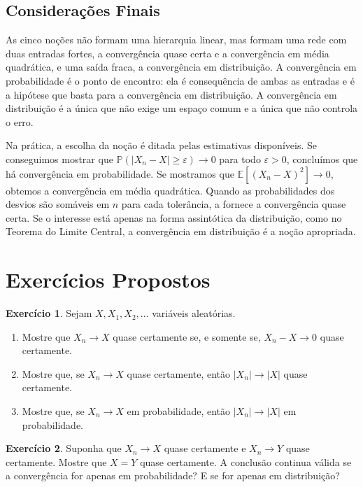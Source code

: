 \documentclass[12pt,portuguese]{article}
\theoremstyle{definition}
\theoremstyle{plainexercise}
\newtheorem{exercise}{Exercício}
\theoremstyle{starredexercise}
\theoremstyle{definition}
\begin{document}
\subsection{Considerações Finais}\label{subsec:leitura-final}

As cinco noções não formam uma hierarquia linear, mas formam uma rede com duas
entradas fortes, a convergência quase certa e a convergência em média
quadrática, e uma saída fraca, a convergência em distribuição. A convergência em
probabilidade é o ponto de encontro: ela é consequência de ambas as entradas e
é a hipótese que basta para a convergência em distribuição. A convergência em
distribuição é a única que não exige um espaço comum e a única que não controla
o erro.

Na prática, a escolha da noção é ditada pelas estimativas disponíveis. Se
conseguimos mostrar que
$\mathbb{P}(|X_n-X|\geqslant\varepsilon)\to0$ para todo $\varepsilon>0$,
concluímos que há convergência em probabilidade. Se mostramos que
$\mathbb{E}[(X_n-X)^2]\to0$, obtemos a convergência em média quadrática. Quando
as probabilidades dos desvios são somáveis em $n$ para cada tolerância, a
 fornece a convergência quase certa. Se o interesse está
apenas na forma assintótica da distribuição, como no Teorema do Limite Central,
a convergência em distribuição é a noção apropriada.


\section{Exercícios Propostos}\label{sec:exercicios}

\begin{exercise}\label{exercise:qc-propriedades}
Sejam $X,X_1,X_2,\ldots$ variáveis aleatórias.
\begin{enumerate}
\item[(a)] Mostre que $X_n\to X$ quase certamente se, e somente se,
$X_n-X\to0$ quase certamente.
\item[(b)] Mostre que, se $X_n\to X$ quase certamente, então
$|X_n|\to|X|$ quase certamente.
\item[(c)] Mostre que, se $X_n\to X$ em probabilidade, então
$|X_n|\to|X|$ em probabilidade.
\end{enumerate}
\end{exercise}

\begin{exercise}\label{exercise:unicidade}
Suponha que $X_n\to X$ quase certamente e $X_n\to Y$ quase certamente. Mostre
que $X=Y$ quase certamente. A conclusão continua válida se a convergência for
apenas em probabilidade? E se for apenas em distribuição?
\end{exercise}
\end{document}
